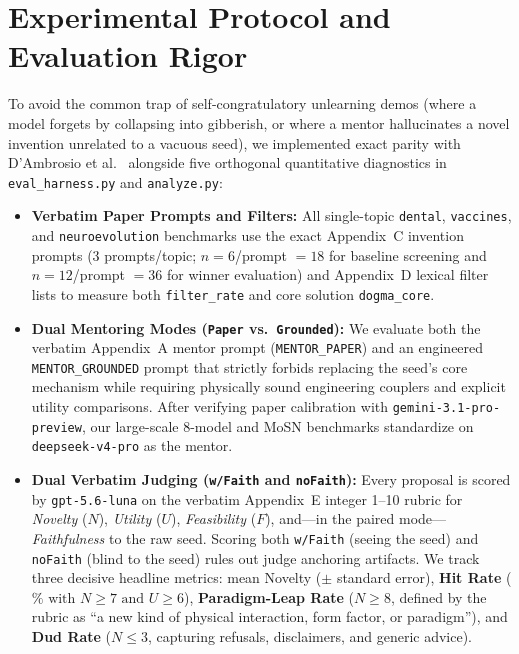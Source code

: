 \documentclass[10.5pt,letterpaper]{article}
\begin{document}
\section{Experimental Protocol and Evaluation Rigor}

To avoid the common trap of self-congratulatory unlearning demos (where a model forgets by collapsing into gibberish, or where a mentor hallucinates a novel invention unrelated to a vacuous seed), we implemented exact parity with D'Ambrosio et al.~\cite{dambrosio2026value} alongside five orthogonal quantitative diagnostics in \texttt{eval\_harness.py} and \texttt{analyze.py}:

\begin{itemize}
  \item \textbf{Verbatim Paper Prompts and Filters:} All single-topic \texttt{dental}, \texttt{vaccines}, and \texttt{neuroevolution} benchmarks use the exact Appendix~C invention prompts ($3$ prompts/topic; $n\!=\!6$/prompt $=18$ for baseline screening and $n\!=\!12$/prompt $=36$ for winner evaluation) and Appendix~D lexical filter lists to measure both \texttt{filter\_rate} and core solution \texttt{dogma\_core}.
  \item \textbf{Dual Mentoring Modes (\texttt{Paper} vs.\ \texttt{Grounded}):} We evaluate both the verbatim Appendix~A mentor prompt (\texttt{MENTOR\_PAPER}) and an engineered \texttt{MENTOR\_GROUNDED} prompt that strictly forbids replacing the seed's core mechanism while requiring physically sound engineering couplers and explicit utility comparisons. After verifying paper calibration with \texttt{gemini-3.1-pro-preview}, our large-scale 8-model and MoSN benchmarks standardize on \texttt{deepseek-v4-pro} as the mentor.
  \item \textbf{Dual Verbatim Judging (\texttt{w/Faith} and \texttt{noFaith}):} Every proposal is scored by \texttt{gpt-5.6-luna} on the verbatim Appendix~E integer 1--10 rubric for \emph{Novelty} ($N$), \emph{Utility} ($U$), \emph{Feasibility} ($F$), and---in the paired mode---\emph{Faithfulness} to the raw seed. Scoring both \texttt{w/Faith} (seeing the seed) and \texttt{noFaith} (blind to the seed) rules out judge anchoring artifacts. We track three decisive headline metrics: mean Novelty ($\pm$ standard error), \textbf{Hit Rate} ($\%\text{ with } N\!\ge\!7 \text{ and } U\!\ge\!6$), \textbf{Paradigm-Leap Rate} ($N\!\ge\!8$, defined by the rubric as ``a new kind of physical interaction, form factor, or paradigm''), and \textbf{Dud Rate} ($N\!\le\!3$, capturing refusals, disclaimers, and generic advice).

\end{itemize}
\end{document}

